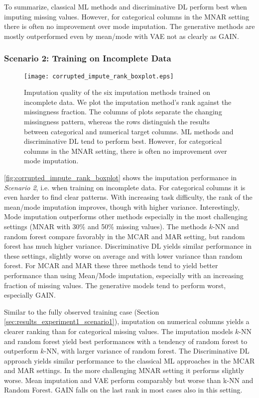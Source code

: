 To summarize, classical ML methods and discriminative DL perform best when imputing missing values. However, for categorical columns in the MNAR setting there is often no improvement over mode imputation. The generative methods are mostly outperformed even by mean/mode with VAE not as clearly as GAIN.


\subsubsection{Scenario 2: Training on Incomplete Data}


\begin{figure}\centering
    \texttt{[image: corrupted\_impute\_rank\_boxplot.eps]}

    \caption[Imputation Ranks - Corrupted]{Imputation quality of the six imputation methods trained on incomplete data. We plot the imputation method's rank against the missingness fraction. The columns of plots separate the changing missingness pattern, whereas the rows distinguish the results between categorical and numerical target columns. ML methods and discriminative DL tend to perform best. However, for categorical columns in the MNAR setting, there is often no improvement over mode imputation. 
    }
	\label{fig:corrupted_impute_rank_boxplot}
\end{figure}

\autoref{fig:corrupted_impute_rank_boxplot} shows the imputation performance in \textit{Scenario 2}, i.e. when training on incomplete data. For categorical columns it is even harder to find clear patterns. With increasing task difficulty, the rank of the mean/mode imputation improves, though with higher variance. Interestingly, Mode imputation outperforms other methods especially in the most challenging settings (MNAR with 30\% and 50\% missing values). The methods $k$-NN and random forest compare favorably in the MCAR and MAR setting, but random forest has much higher variance. Discriminative DL yields similar performance in these settings, slightly worse on average and with lower variance than random forest. For MCAR and MAR these three methods tend to yield better performance than using Mean/Mode imputation, especially with an increasing fraction of missing values. The generative models tend to perform worst, especially GAIN.

Similar to the fully observed training case (Section \ref{sec:results_experiment1_scenario1}), imputation on numerical columns yields a clearer ranking than for categorical missing values. The imputation models $k$-NN and random forest yield best performances with a tendency of random forest to outperform $k$-NN, with larger variance of random forest. The Discriminative DL approach yields similar performance to the classical ML approaches in the MCAR and MAR settings. In the more challenging MNAR setting it performs slightly worse. Mean imputation and VAE perform comparably but worse than k-NN and Random Forest. GAIN falls on the last rank in most cases also in this setting.

